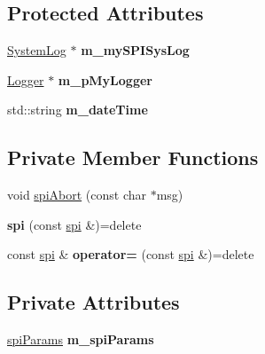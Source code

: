 \subsection*{Protected Attributes}
\begin{DoxyCompactItemize}
\item 
\hypertarget{classspi_a30e62f162a7381cb154ceba749c3f9ba}{\hyperlink{classSystemLog}{System\-Log} $\ast$ {\bfseries m\-\_\-my\-S\-P\-I\-Sys\-Log}}\label{classspi_a30e62f162a7381cb154ceba749c3f9ba}

\item 
\hypertarget{classspi_a6b36076244edf6f661198f69c6b89b2d}{\hyperlink{classLogger}{Logger} $\ast$ {\bfseries m\-\_\-p\-My\-Logger}}\label{classspi_a6b36076244edf6f661198f69c6b89b2d}

\item 
\hypertarget{classspi_aa584b9b3ec842ac93204341966469d4c}{std\-::string {\bfseries m\-\_\-date\-Time}}\label{classspi_aa584b9b3ec842ac93204341966469d4c}

\end{DoxyCompactItemize}
\subsection*{Private Member Functions}
\begin{DoxyCompactItemize}
\item 
void \hyperlink{classspi_a7a176c5e112e2de900a823756d07af9d}{spi\-Abort} (const char $\ast$msg)
\item 
\hypertarget{classspi_a6855e6d729c1b70a51323596503b43a7}{{\bfseries spi} (const \hyperlink{classspi}{spi} \&)=delete}\label{classspi_a6855e6d729c1b70a51323596503b43a7}

\item 
\hypertarget{classspi_af6266e8c219e5b5ef4be205239379f14}{const \hyperlink{classspi}{spi} \& {\bfseries operator=} (const \hyperlink{classspi}{spi} \&)=delete}\label{classspi_af6266e8c219e5b5ef4be205239379f14}

\end{DoxyCompactItemize}
\subsection*{Private Attributes}
\begin{DoxyCompactItemize}
\item 
\hypertarget{classspi_afa6f0cf71472956e1b063b60421d6eeb}{\hyperlink{structspiParams}{spi\-Params} {\bfseries m\-\_\-spi\-Params}}\label{classspi_afa6f0cf71472956e1b063b60421d6eeb}

\end{DoxyCompactItemize}


